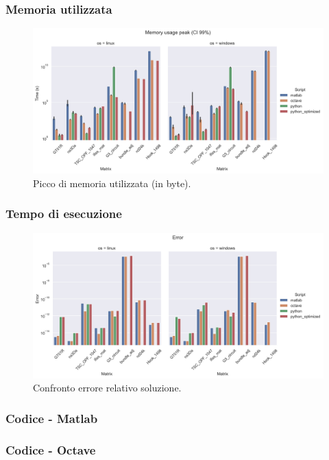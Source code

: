 \documentclass{beamer}
\begin{document}
\begin{frame}
	\frametitle{Memoria utilizzata}
	\begin{figure}
		\includegraphics[width=1.35\textheight]{assets/memory.jpg}
		\caption{Picco di memoria utilizzata (in byte).}
		\label{fig:memory}
	\end{figure}
\end{frame}

\begin{frame}
	\frametitle{Tempo di esecuzione}
	\begin{figure}
		\includegraphics[width=1.35\textheight]{assets/error.jpg}
		\caption{Confronto errore relativo soluzione.}
		\label{fig:error}
	\end{figure}
\end{frame}

\begin{frame}
	\frametitle{Codice - Matlab}
	
\end{frame}


\begin{frame}
	\frametitle{Codice - Octave}
	
\end{frame}
\end{document}
